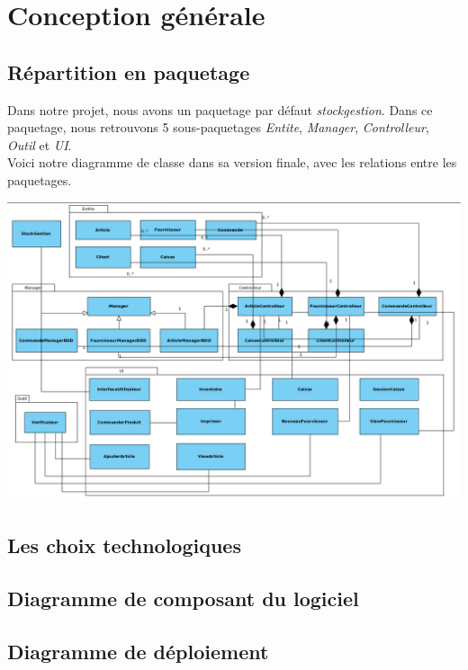 \chapter{Conception générale}

\section{Répartition en paquetage}

Dans notre projet, nous avons un paquetage par défaut \textit{stockgestion}. Dans ce paquetage, nous retrouvons 5 sous-paquetages \textit{Entite}, \textit{Manager}, \textit{Controlleur}, \textit{Outil} et \textit{UI}.\\

Voici notre diagramme de classe dans sa version finale, avec les relations entre les paquetages.

\begin{center}
\includegraphics[width=14cm]{./Conception/DiagrammeDeClassePackage}
\end{center}


\section{Les choix technologiques}

\section{Diagramme de composant du logiciel}

\section{Diagramme de déploiement}




